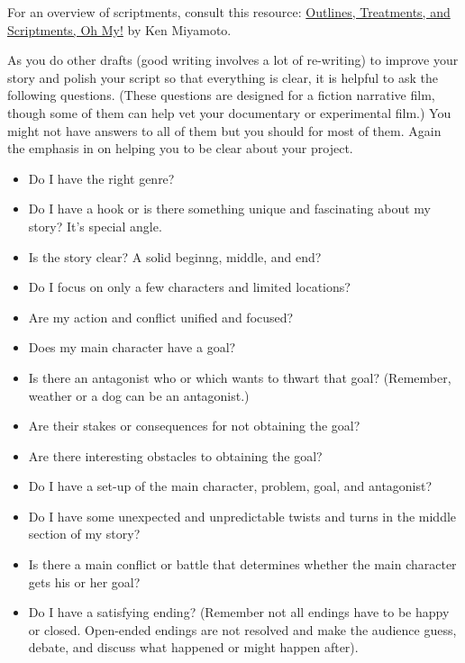 \documentclass[
]{book}
\providecommand{\tightlist}{%
  \setlength{\itemsep}{0pt}\setlength{\parskip}{0pt}}
\begin{document}
\begin{reflect}
For an overview of scriptments, consult this resource: \href{https://screencraft.org/blog/outlines-treatments-and-scriptments-oh-my/}{Outlines, Treatments, and Scriptments, Oh My!} by Ken Miyamoto.

As you do other drafts (good writing involves a lot of re-writing) to improve your story and polish your script so that everything is clear, it is helpful to ask the following questions. (These questions are designed for a fiction narrative film, though some of them can help vet your documentary or experimental film.) You might not have answers to all of them but you should for most of them. Again the emphasis in on helping you to be clear about your project.

\begin{itemize}
\tightlist
\item
  Do I have the right genre?\\
\item
  Do I have a hook or is there something unique and fascinating about my story? It's special angle.\\
\item
  Is the story clear? A solid beginng, middle, and end?\\
\item
  Do I focus on only a few characters and limited locations?\\
\item
  Are my action and conflict unified and focused?\\
\item
  Does my main character have a goal?\\
\item
  Is there an antagonist who or which wants to thwart that goal? (Remember, weather or a dog can be an antagonist.)\\
\item
  Are their stakes or consequences for not obtaining the goal?\\
\item
  Are there interesting obstacles to obtaining the goal?\\
\item
  Do I have a set-up of the main character, problem, goal, and antagonist?\\
\item
  Do I have some unexpected and unpredictable twists and turns in the middle section of my story?\\
\item
  Is there a main conflict or battle that determines whether the main character gets his or her goal?\\
\item
  Do I have a satisfying ending? (Remember not all endings have to be happy or closed. Open-ended endings are not resolved and make the audience guess, debate, and discuss what happened or might happen after).
\end{itemize}


\end{reflect}
\end{document}
